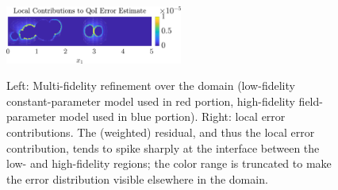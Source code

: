 \documentclass[review,sort&compress]{elsarticle}
\theoremstyle{plain} %
\theoremstyle{definition} %
\begin{document}
\begin{figure}[htbp]
{  \includegraphics[width=0.52\textwidth]{svf/err_breakdown_MF02.pdf} %
} \\
\caption{Left: Multi-fidelity refinement over the domain (low-fidelity constant-parameter model used in red portion, high-fidelity field-parameter model used in blue portion). Right: local error contributions. The (weighted) residual, and thus the local error contribution, tends to spike sharply at the interface between the low- and high-fidelity regions; the color range is truncated to make the error distribution visible elsewhere in the domain.}
\label{fig:svfRef}
\end{figure}
\end{document}
